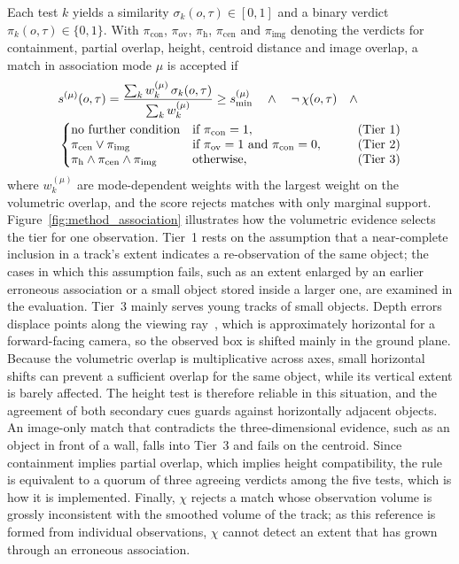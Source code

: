 {Each test $k$ yields a similarity $\sigma_k(o, \tau) \in [0, 1]$ and a binary verdict $\pi_k(o, \tau) \in \{0, 1\}$. With $\pi_{\mathrm{con}}$, $\pi_{\mathrm{ov}}$, $\pi_{\mathrm{h}}$, $\pi_{\mathrm{cen}}$ and $\pi_{\mathrm{img}}$ denoting the verdicts for containment, partial overlap, height, centroid distance and image overlap, a match in association mode $\mu$ is accepted if
\begin{equation}
	\begin{aligned}
	&s^{(\mu)}(o, \tau) = \frac{\sum_{k} w_k^{(\mu)}\, \sigma_k(o, \tau)}{\sum_{k} w_k^{(\mu)}} \geq s_{\min}^{(\mu)}
	\quad \wedge \quad
	\neg\, \chi(o, \tau)
	\quad \wedge \\
	&\left\{\begin{array}{@{}lll@{}}
		\text{no further condition} & \text{if } \pi_{\mathrm{con}} = 1, & \qquad \text{(Tier 1)}\\
		\pi_{\mathrm{cen}} \vee \pi_{\mathrm{img}} & \text{if } \pi_{\mathrm{ov}} = 1 \text{ and } \pi_{\mathrm{con}} = 0, & \qquad \text{(Tier 2)}\\
		\pi_{\mathrm{h}} \wedge \pi_{\mathrm{cen}} \wedge \pi_{\mathrm{img}} & \text{otherwise}, & \qquad \text{(Tier 3)}
	\end{array}\right.
	\end{aligned}
	\label{eq:association_score}
\end{equation}
where $w_k^{(\mu)}$ are mode-dependent weights with the largest weight on the volumetric overlap, and the score rejects matches with only marginal support. Figure~\ref{fig:method_association} illustrates how the volumetric evidence selects the tier for one observation. Tier~1 rests on the assumption that a near-complete inclusion in a track's extent indicates a re-observation of the same object; the cases in which this assumption fails, such as an extent enlarged by an earlier erroneous association or a small object stored inside a larger one, are examined in the evaluation. Tier~3 mainly serves young tracks of small objects. Depth errors displace points along the viewing ray~\cite{keselman2017realsense}, which is approximately horizontal for a forward-facing camera, so the observed box is shifted mainly in the ground plane. Because the volumetric overlap is multiplicative across axes, small horizontal shifts can prevent a sufficient overlap for the same object, while its vertical extent is barely affected. The height test is therefore reliable in this situation, and the agreement of both secondary cues guards against horizontally adjacent objects. An image-only match that contradicts the three-dimensional evidence, such as an object in front of a wall, falls into Tier~3 and fails on the centroid. Since containment implies partial overlap, which implies height compatibility, the rule is equivalent to a quorum of three agreeing verdicts among the five tests, which is how it is implemented. Finally, $\chi$ rejects a match whose observation volume is grossly inconsistent with the smoothed volume of the track; as this reference is formed from individual observations, $\chi$ cannot detect an extent that has grown through an erroneous association.



}
